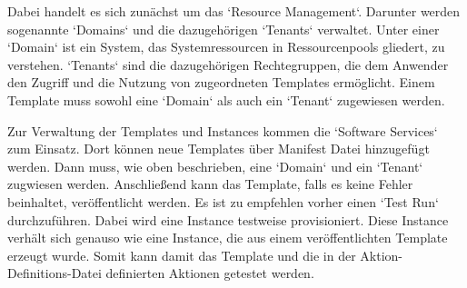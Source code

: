 Dabei handelt es sich zunächst um das `Resource Management`.
Darunter werden sogenannte `Domains` und die dazugehörigen `Tenants` verwaltet.
Unter einer `Domain` ist ein System, das Systemressourcen in Ressourcenpools gliedert, zu verstehen.
`Tenants` sind die dazugehörigen Rechtegruppen, die dem Anwender den Zugriff und die Nutzung von zugeordneten Templates ermöglicht.
Einem Template muss sowohl eine `Domain` als auch ein `Tenant` zugewiesen werden.
\cite{Rotthove.2018}

Zur Verwaltung der Templates und Instances kommen die `Software Services` zum Einsatz.
Dort können neue Templates über Manifest Datei hinzugefügt werden.
Dann muss, wie oben beschrieben, eine `Domain` und ein `Tenant` zugwiesen werden.
Anschließend kann das Template, falls es keine Fehler beinhaltet, veröffentlicht werden.
Es ist zu empfehlen vorher einen `Test Run` durchzuführen.
Dabei wird eine Instance testweise provisioniert.
Diese Instance verhält sich genauso wie eine Instance, die aus einem veröffentlichten Template erzeugt wurde.
Somit kann damit das Template und die in der Aktion-Definitions-Datei definierten Aktionen getestet werden.
\cite{Rotthove.2018}
